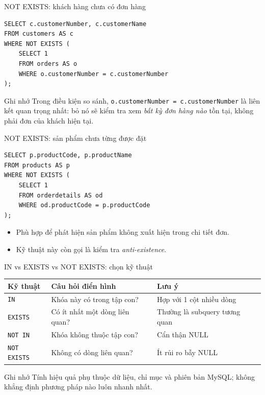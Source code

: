 \documentclass[aspectratio=169,10pt]{beamer}
\newcommand{\code}[1]{\texttt{#1}}
\begin{document}
\begin{frame}[fragile]{NOT EXISTS: khách hàng chưa có đơn hàng}
\begin{lstlisting}
SELECT c.customerNumber, c.customerName
FROM customers AS c
WHERE NOT EXISTS (
    SELECT 1
    FROM orders AS o
    WHERE o.customerNumber = c.customerNumber
);
\end{lstlisting}
\begin{block}{Ghi nhớ}
\small Trong điều kiện so sánh, \code{o.customerNumber = c.customerNumber} là liên kết quan trọng nhất: bỏ nó sẽ kiểm tra xem \emph{bất kỳ đơn hàng nào} tồn tại, không phải đơn của khách hiện tại.
\end{block}
\end{frame}

\begin{frame}[fragile]{NOT EXISTS: sản phẩm chưa từng được đặt}
\begin{lstlisting}
SELECT p.productCode, p.productName
FROM products AS p
WHERE NOT EXISTS (
    SELECT 1
    FROM orderdetails AS od
    WHERE od.productCode = p.productCode
);
\end{lstlisting}
\begin{itemize}
\item Phù hợp để phát hiện sản phẩm không xuất hiện trong chi tiết đơn.
\item Kỹ thuật này còn gọi là kiểm tra \emph{anti-existence}.
\end{itemize}
\end{frame}

\begin{frame}[fragile]{IN vs EXISTS vs NOT EXISTS: chọn kỹ thuật}
\small
\begin{tabularx}{\linewidth}{l X X}\toprule
Kỹ thuật & Câu hỏi điển hình & Lưu ý\\\midrule
\code{IN} & Khóa này có trong tập con? & Hợp với 1 cột nhiều dòng\\
\code{EXISTS} & Có ít nhất một dòng liên quan? & Thường là subquery tương quan\\
\code{NOT IN} & Khóa không thuộc tập con? & Cẩn thận NULL\\
\code{NOT EXISTS} & Không có dòng liên quan? & Ít rủi ro bẫy NULL\\\bottomrule
\end{tabularx}
\vspace{.6em}
\begin{block}{Ghi nhớ}
\small Tính hiệu quả phụ thuộc dữ liệu, chỉ mục và phiên bản MySQL; không khẳng định phương pháp nào luôn nhanh nhất.
\end{block}
\end{frame}
\end{document}

